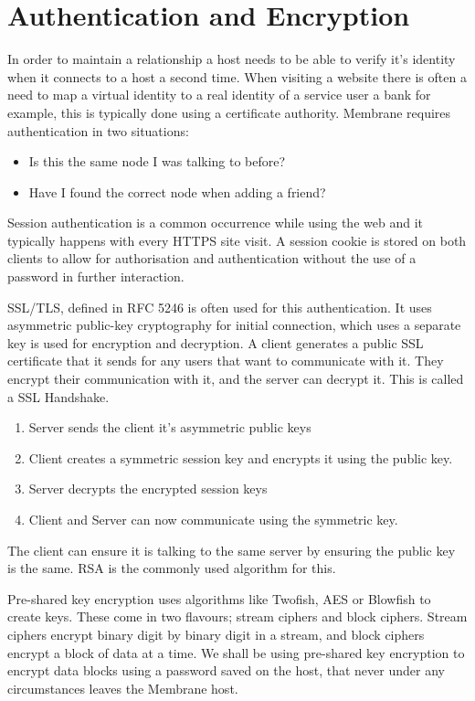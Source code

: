 \documentclass[11pt, a4paper, twocolumn, twoside]{report}
\begin{document}
\section{Authentication and Encryption} \label{sec:encryption}

In order to maintain a relationship a host needs to be able to verify it's identity when it connects to a host a second time. When visiting a website there is often a need to map a virtual identity to a real identity of a service user \citep{hericourt2001method} a bank for example, this is typically done using a certificate authority. Membrane requires authentication in two situations:
\begin{itemize}
 \item Is this the same node I was talking to before?
 \item Have I found the correct node when adding a friend?
\end{itemize}
Session authentication is a common occurrence while using the web and it typically happens with every HTTPS site visit. A session cookie is stored on both clients to allow for authorisation and authentication without the use of a password in further interaction. \citep{mayo2008security}

SSL/TLS, defined in RFC 5246 \citep{dierks2008transport} is often used for this authentication. It uses asymmetric public-key cryptography for initial connection, which uses a separate key is used for encryption and decryption. A client generates a public SSL certificate that it sends for any users that want to communicate with it. They encrypt their communication with it, and the server can decrypt it. This is called a SSL Handshake.
\begin{enumerate}
 \item Server sends the client it's asymmetric public keys
 \item Client creates a symmetric session key and encrypts it using the public key.
 \item Server decrypts the encrypted session keys
 \item Client and Server can now communicate using the symmetric key.
\end{enumerate}
The client can ensure it is talking to the same server by ensuring the public key is the same. RSA is the commonly used algorithm for this.

Pre-shared key encryption uses algorithms like Twofish, AES or Blowfish to create keys. These come in two flavours; stream ciphers and block ciphers. Stream ciphers encrypt binary digit by binary digit in a stream, and block ciphers encrypt a block of data at a time. We shall be using pre-shared key encryption to encrypt data blocks using a password saved on the host, that never under any circumstances leaves the Membrane host.
\end{document}
